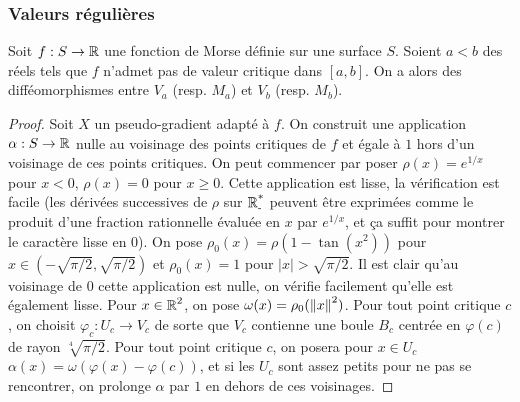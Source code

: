 \subsubsection{Valeurs régulières}

\begin{thm}
    Soit $f:S\to\operatorname{\mathbb R}$ une fonction de Morse définie sur une surface $S$.
    Soient $a<b$ des réels tels que $f$ n'admet pas de valeur critique dans $[a,b]$.
    On a alors des difféomorphismes entre $V_a$ (resp. $M_a$) et $V_b$ (resp. $M_b$).
\end{thm}

\begin{proof}
    Soit $X$ un pseudo-gradient adapté à $f$. 
    On construit une application $\alpha:S\to\operatorname{\mathbb R}$ nulle au voisinage des points critiques 
    de $f$ et  égale à $1$ hors d'un voisinage de ces points critiques.
    On peut commencer par poser $\rho(x)=e^{1/x}$ pour $x<0$, $\rho(x)=0$ pour $x\geq 0$. 
    Cette application est lisse, la vérification est facile (les dérivées successives de 
    $\rho$ sur $\operatorname{\mathbb R_-^*}$ peuvent être exprimées comme le produit d'une fraction rationnelle 
    évaluée en $x$ par $e^{1/x}$, et ça suffit pour montrer le caractère lisse en $0$).
    On pose $\rho_0(x)=\rho(1-\tan(x^2))$ pour $x\in(-\sqrt{\pi/2},\sqrt{\pi/2})$ et 
    $\rho_0(x)=1$ pour $|x|>\sqrt{\pi/2}$. 
    Il est clair qu'au voisinage de $0$ cette application est nulle, on vérifie facilement qu'elle est également lisse. 
    Pour $x\in\operatorname{\mathbb R}^2$, on pose $\omega(x)=\rho_0(\left\lVert x\right\rVert^2)$.
    Pour tout point critique $c$, on choisit $\varphi_c:U_c\to V_c$ de sorte que $V_c$ 
    contienne une boule $B_c$ centrée en $\varphi(c)$ de rayon $\sqrt[4]{\pi/2}$.
    Pour tout point critique $c$, on posera pour $x\in U_c$ 
    $\alpha(x)=\omega(\varphi(x)-\varphi(c))$, et si les $U_c$ sont assez petits pour
    ne pas se rencontrer, on prolonge $\alpha$ par $1$ en dehors de ces voisinages.


\end{proof}

